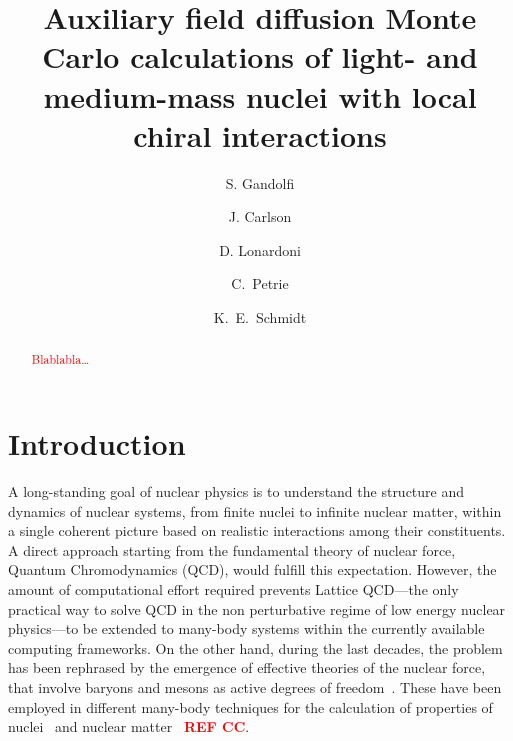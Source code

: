 \documentclass[aps,prc,twocolumn,superscriptaddress,floatfix]{revtex4-1}
\newcommand{\red}[1]{\protect\textcolor{red}{#1}}
\begin{document}
\title{Auxiliary field diffusion Monte Carlo calculations of light- and medium-mass nuclei with local chiral interactions}

\author{S. Gandolfi}
\author{J. Carlson}

\author{D. Lonardoni}

\author{C.~Petrie}
\author{K.~E.~Schmidt}

\begin{abstract}
\red{Blablabla\ldots}
\end{abstract}

\maketitle

\section{Introduction}
\label{sec:intro}
A long-standing goal of nuclear physics is to understand the structure and dynamics 
of nuclear systems, from finite nuclei to infinite nuclear matter, within a single 
coherent picture based on realistic interactions among their constituents.
A direct approach starting from the fundamental theory of nuclear force, Quantum Chromodynamics (QCD), 
would fulfill this expectation. However, the amount of computational effort required prevents 
Lattice QCD---the only practical way to solve QCD in the non perturbative regime of low energy 
nuclear physics---to be extended to many-body systems within the currently available computing frameworks.
On the other hand, during the last decades, the problem has been rephrased by the emergence of 
effective theories of the nuclear force, that involve baryons and mesons as active degrees of 
freedom~\cite{Wiringa:1995,Epelbaum:2009,Machleidt:2011,Ekstrom:2013,Gezerlis:2014,Entem:2015,
Epelbaum:2015,Ekstrom:2015,Piarulli:2015,Lynn:2016,Ekstrom:2017}. These have been 
employed in different many-body techniques for the calculation of properties of 
nuclei~\cite{Barrett:2013,Hagen:2013,Carlson:2015,Hergert:2015} 
and nuclear matter~\cite{Akmal:1998,Hebeler:2013,Carlson:2015}
\red{\bf REF CC}.
\end{document}

